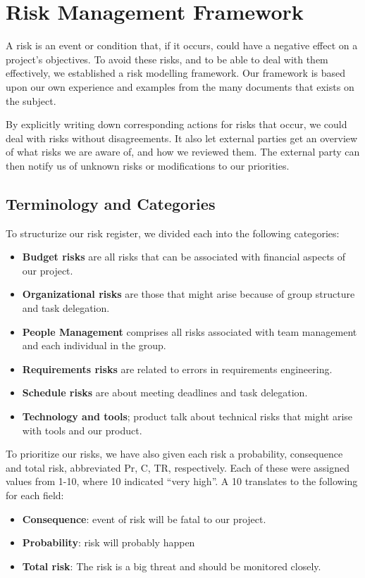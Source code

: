 \chapter{Risk Management Framework}
A risk is an event or condition that, if it occurs, could have a negative
effect on a project's objectives. To avoid these risks, and to be able to deal
with them effectively, we established a risk modelling framework.  Our
framework is based upon our own experience and examples from the many documents
that exists on the subject.

By explicitly writing down corresponding actions for risks that occur, we could
deal with risks without disagreements. It also let external parties get an
overview of what risks we are aware of, and how we reviewed them. The external
party can then notify us of unknown risks or modifications to our priorities. 

\section{Terminology and Categories}

To structurize our risk register, we divided each into the following
categories:
\begin{itemize}
    \item \textbf{Budget risks} are all risks that can be associated with
        financial aspects of our project.
    \item \textbf{Organizational risks} are those that might arise because of
    group structure and task delegation.
    \item \textbf{People Management} comprises all risks associated with team
        management and each individual in the group.
    \item \textbf{Requirements risks} are related to errors in requirements
        engineering.
    \item \textbf{Schedule risks} are about meeting deadlines and task
        delegation.
    \item \textbf{Technology and tools}; product talk about technical risks that
        might arise with tools and our product.
\end{itemize}

To prioritize our risks, we have also given each risk a probability,
consequence and total risk, abbreviated Pr, C, TR, respectively. Each
of these were assigned values from 1-10, where 10 indicated
``very high''. A 10 translates to
the following for each field:
\begin{itemize}
    \item \textbf{Consequence}: event of risk will be fatal to our project.
    \item \textbf{Probability}: risk will probably happen
    \item \textbf{Total risk}: The risk is a big threat and should be monitored closely.
\end{itemize}

